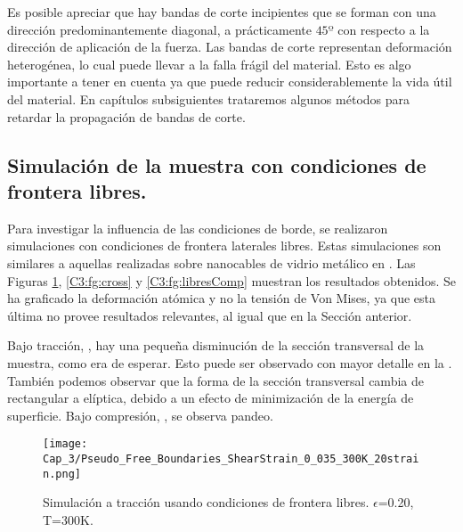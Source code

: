 Es posible apreciar que hay bandas de corte incipientes que se forman con una dirección predominantemente diagonal, a prácticamente $45º$ con respecto a la dirección de aplicación de la fuerza. Las bandas de corte representan deformación heterogénea, lo cual puede llevar a la falla frágil del material. Esto es algo importante a tener en cuenta ya que puede reducir considerablemente la vida útil del material. En capítulos subsiguientes trataremos algunos métodos para retardar la propagación de bandas de corte.

\subsection{Simulación de la muestra con condiciones de frontera libres.}
\label{S3_3_2}

Para investigar la influencia de las condiciones de borde, se realizaron simulaciones con condiciones de frontera laterales libres. Estas simulaciones son similares a aquellas realizadas sobre nanocables de vidrio metálico en \cite{xiao12}. Las Figuras \ref{C3:fg:libresTen}, \ref{C3:fg:cross} y \ref{C3:fg:libresComp} muestran los resultados obtenidos. Se ha graficado la deformación atómica y no la tensión de Von Mises, ya que esta última no provee resultados relevantes, al igual que en la Sección anterior.

Bajo tracción, , hay una pequeña disminución de la sección transversal de la muestra, como era de esperar. Esto puede ser observado con mayor detalle en la . También podemos observar que la forma de la sección transversal cambia de rectangular a elíptica, debido a un efecto de minimización de la energía de superficie. Bajo compresión, , se observa pandeo.


\begin{figure}[htp]
\centering
\texttt{[image: Cap\_3/Pseudo\_Free\_Boundaries\_ShearStrain\_0\_035\_300K\_20strain.png]}
\caption[Simulación a tracción usando condiciones de frontera libres]{Simulación a tracción usando condiciones de frontera libres. $\epsilon$=0.20, T=300K.}
\label{C3:fg:libresTen}
\end{figure}

